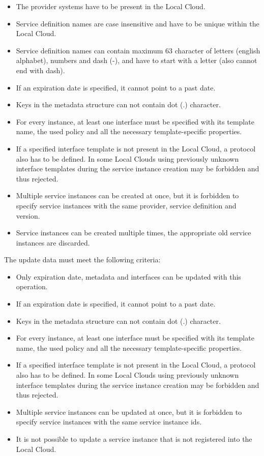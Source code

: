 \documentclass[a4paper]{arrowhead}
\begin{document}
\begin{itemize}
    \item The provider systems have to be present in the Local Cloud.
    \item Service definition names are case insensitive and have to be unique within the Local Cloud.
    \item Service definition names can contain maximum 63 character of letters (english alphabet), numbers and dash (-), and have to start with a letter (also cannot end with dash).
    \item If an expiration date is specified, it cannot point to a past date.
    \item Keys in the metadata structure can not contain dot (.) character.
    \item For every instance, at least one interface must be specified with its template name, the used policy and all the necessary template-specific properties.
    \item If a specified interface template is not present in the Local Cloud, a protocol also has to be defined. In some Local Clouds using previously unknown interface templates during the service instance creation may be forbidden and thus rejected.
    \item Multiple service instances can be created at once, but it is forbidden to specify service instances with the same provider, service definition and version.
    \item Service instances can be created multiple times, the appropriate old service instances are discarded.
\end{itemize}


The update data must meet the following criteria:

\begin{itemize}
    \item Only expiration date, metadata and interfaces can be updated with this operation.
    \item If an expiration date is specified, it cannot point to a past date.
    \item Keys in the metadata structure can not contain dot (.) character.
    \item For every instance, at least one interface must be specified with its template name, the used policy and all the necessary template-specific properties.
    \item If a specified interface template is not present in the Local Cloud, a protocol also has to be defined. In some Local Clouds using previously unknown interface templates during the service instance creation may be forbidden and thus rejected.
    \item Multiple service instances can be updated at once, but it is forbidden to specify service instances with the same service instance ids.
    \item It is not possible to update a service instance that is not registered into the Local Cloud.
\end{itemize}
\end{document}
